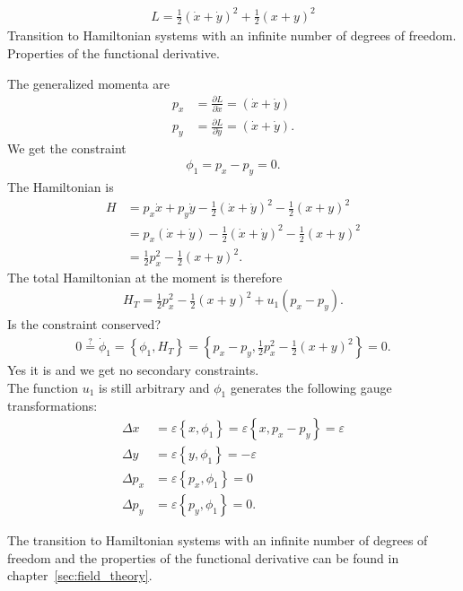 \begin{exercise}
\begin{align*}
L = \frac{1}{2} (\dot{x} + \dot{y})^2 + \frac{1}{2} (x + y)^2
\end{align*}
Transition to Hamiltonian systems with an infinite number of degrees of freedom. \\
Properties of the functional derivative. 
\end{exercise}
\begin{solution}
The generalized momenta are
\begin{align*}
p_x &= \frac{\partial L}{\partial \dot{x}} = (\dot{x} + \dot{y}) \\
p_y &= \frac{\partial L}{\partial \dot{y}} = (\dot{x} + \dot{y}) .
\end{align*}
We get the constraint 
\begin{align*}
\phi_1 = p_x - p_y = 0.
\end{align*}
The Hamiltonian is
\begin{align*}
H &= p_x \dot{x} + p_y \dot{y} - \frac{1}{2} (\dot{x} + \dot{y})^2 - \frac{1}{2} (x + y)^2 \\
&= p_x (\dot{x} + \dot{y}) - \frac{1}{2} (\dot{x} + \dot{y})^2 - \frac{1}{2} (x + y)^2 \\
&= \frac{1}{2} p_x^2 - \frac{1}{2} (x + y)^2.
\end{align*}
The total Hamiltonian at the moment is therefore
\begin{align*}
H_T = \frac{1}{2} p_x^2 - \frac{1}{2} (x + y)^2 + u_1 (p_x - p_y).
\end{align*}
Is the constraint conserved?
\begin{align*}
0 \overset{?}{=} \dot{\phi}_1 = \left \{ \phi_1,H_T \right \} = \left \{ p_x - p_y,\frac{1}{2} p_x^2 - \frac{1}{2} (x + y)^2 \right \} = 0.
\end{align*}
Yes it is and we get no secondary constraints. \\
The function $u_1$ is still arbitrary and $\phi_1$ generates the following gauge transformations:
\begin{align*}
\Delta x &= \varepsilon \left \{ x,\phi_1 \right \} = \varepsilon \left \{ x,p_x - p_y \right \} = \varepsilon \\
\Delta y &= \varepsilon \left \{ y,\phi_1 \right \} = - \varepsilon \\
\Delta p_x &= \varepsilon \left \{ p_x,\phi_1 \right \} = 0 \\
\Delta p_y &= \varepsilon \left \{ p_y,\phi_1 \right \} = 0.
\end{align*}

The transition to Hamiltonian systems with an infinite number of degrees of freedom and the properties of the functional derivative can be found in chapter~\ref{sec:field_theory}.
\end{solution}





